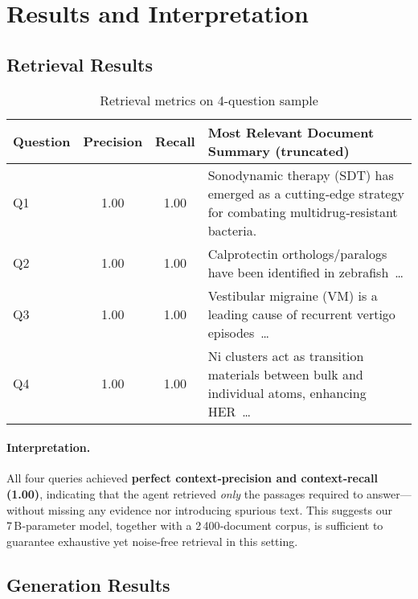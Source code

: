 \documentclass[conference]{IEEEtran}
\begin{document}
\section{Results and Interpretation}

\subsection{Retrieval Results}

\begin{table}[ht]
    \centering
    \caption{Retrieval metrics on 4-question sample}
    \label{tab:retrieval}
    \begin{tabularx}{\linewidth}{lccX}
    \toprule
    \textbf{Question} & \textbf{Precision} & \textbf{Recall} & \textbf{Most Relevant Document Summary (truncated)} \\
    \midrule
    Q1 & 1.00 & 1.00 & Sonodynamic therapy (SDT) has emerged as a cutting‑edge strategy for combating multidrug‑resistant bacteria. \\[2pt]
    Q2 & 1.00 & 1.00 & Calprotectin orthologs/paralogs have been identified in zebrafish … \\[2pt]
    Q3 & 1.00 & 1.00 & Vestibular migraine (VM) is a leading cause of recurrent vertigo episodes … \\[2pt]
    Q4 & 1.00 & 1.00 & Ni clusters act as transition materials between bulk and individual atoms, enhancing HER … \\
    \bottomrule
    \end{tabularx}
\end{table}

\paragraph{Interpretation.}
All four queries achieved \textbf{perfect context‑precision and context‑recall (1.00)}, indicating that the agent retrieved \emph{only} the passages required to answer—without missing any evidence nor introducing spurious text.  
This suggests our 7 B‑parameter model, together with a 2 400‑document corpus, is sufficient to guarantee exhaustive yet noise‑free retrieval in this setting.

\vspace{0.8em}

\subsection{Generation Results}
\end{document}
